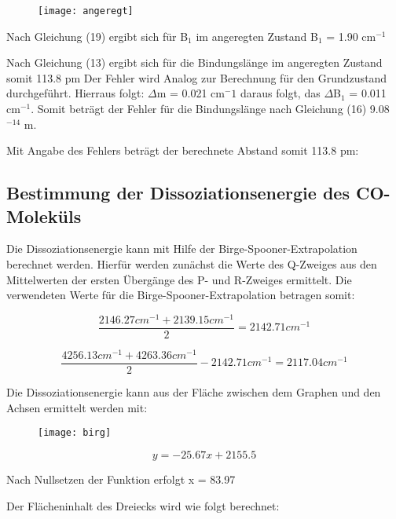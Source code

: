 \documentclass[12pt]{article}
\begin{document}
 \begin{figure}[H]
\centering
\texttt{[image: angeregt]}

\end{figure} 

 
 Nach Gleichung (19) ergibt sich für B$_1$ im angeregten Zustand  B$_1$ = 1.90 cm$^{-1}$
 
 Nach Gleichung (13) ergibt sich für die Bindungslänge im angeregten Zustand somit 113.8 pm  Der Fehler wird Analog zur Berechnung für den Grundzustand durchgeführt. 
 Hierraus folgt:
$\Delta$m = 0.021 cm$^-1$ daraus folgt, das $\Delta$B$_1$ = 0.011 cm$^{-1}$. Somit beträgt der Fehler für die Bindungslänge nach Gleichung (16) 9.08$^{-14}$ m.

Mit Angabe des Fehlers beträgt der berechnete Abstand somit 113.8  pm:


\subsection{Bestimmung der Dissoziationsenergie des CO-Moleküls}

Die Dissoziationsenergie kann mit Hilfe der Birge-Spooner-Extrapolation berechnet werden. Hierfür werden zunächst die Werte des Q-Zweiges aus den Mittelwerten der ersten Übergänge des P- und R-Zweiges ermittelt.
Die verwendeten Werte für die Birge-Spooner-Extrapolation betragen somit:

\begin{equation}
    \frac{2146.27cm^{-1}+2139.15cm^{-1}}{2}= 2142.71 cm^{-1}
\end{equation}

\begin{equation}
    \frac{4256.13cm^{-1}+4263.36cm^{-1}}{2}-2142.71cm^{-1}= 2117.04cm^{-1}
\end{equation}

Die Dissoziationsenergie kann aus der Fläche zwischen dem Graphen und den Achsen ermittelt werden mit:

 \begin{figure}[H]
\centering
\texttt{[image: birg]}
\end{figure} 

\begin{equation}
    y= -25.67x+2155.5
\end{equation}

Nach Nullsetzen der Funktion erfolgt x = 83.97

Der Flächeninhalt des Dreiecks wird wie folgt berechnet:
\end{document}
